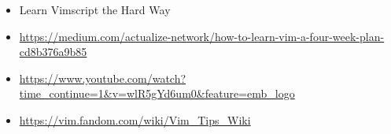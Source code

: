 \documentclass[12pt, letterpaper]{article}
\begin{document}
\begin{itemize}
    \item Learn Vimscript the Hard Way
    \item
        \url{https://medium.com/actualize-network/how-to-learn-vim-a-four-week-plan-cd8b376a9b85}
    \item
        \url{https://www.youtube.com/watch?time_continue=1&v=wlR5gYd6um0&feature=emb_logo}
    \item \url{https://vim.fandom.com/wiki/Vim_Tips_Wiki}
\end{itemize}
\end{document}
